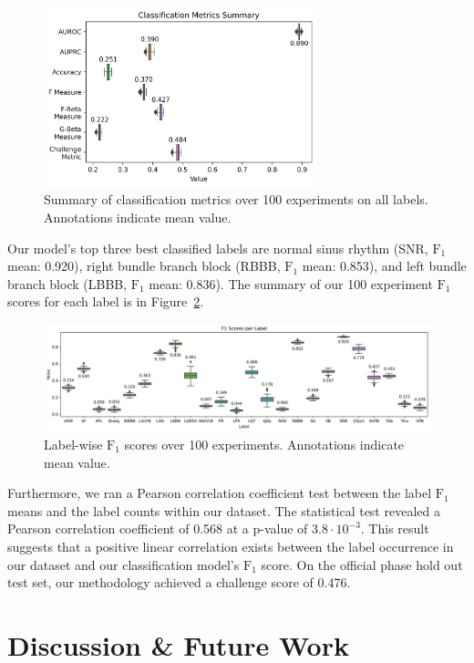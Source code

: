 \documentclass[twocolumn]{cinc}
\begin{document}
\begin{figure}[hb]
  \centering
  \includegraphics[width=7.9cm]{fig/classification_metrics.png}
  \caption{Summary of classification metrics over 100 experiments on all labels. Annotations indicate mean value.}
  \label{fig:classification_metrics_summary}
\end{figure}

Our model's top three best classified labels are normal sinus rhythm (SNR, $\text{F}_1$ mean: 0.920), right bundle branch block (RBBB, $\text{F}_1$ mean: 0.853), and left bundle branch block (LBBB, $\text{F}_1$ mean: 0.836).
The summary of our 100 experiment $\text{F}_1$ scores for each label is in Figure~\ref{fig:f1_score}.

\begin{figure}[ht]
  \centering
  \includegraphics[width=17.0cm]{fig/label_f1s.png}
  \caption{Label-wise $\text{F}_1$ scores over 100 experiments. Annotations indicate mean value.}
  \label{fig:f1_score}
\end{figure}

Furthermore, we ran a Pearson correlation coefficient test between the label $\text{F}_1$ means and the label counts within our dataset.
The statistical test revealed a Pearson correlation coefficient of 0.568 at a p-value of $3.8 \cdot 10^{-3}$.
This result suggests that a positive linear correlation exists between the label occurrence in our dataset and our classification model's $\text{F}_1$ score.
On the official phase hold out test set, our methodology achieved a challenge score of 0.476.


\section{Discussion \& Future Work}
\end{document}
